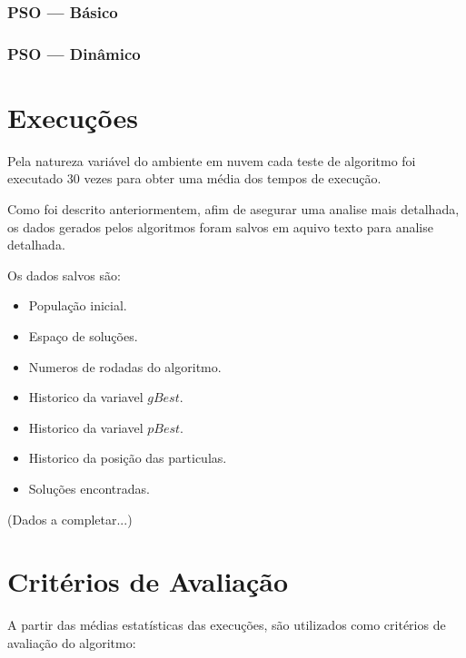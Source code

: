         \subsubsection{PSO — Básico}

        \subsubsection{PSO — Dinâmico}

    



\section{Execuções}
    Pela natureza variável do ambiente em nuvem cada teste de algoritmo foi executado 30 vezes para obter uma média dos tempos de execução.\newline
    
    Como foi descrito anteriormentem, afim de asegurar uma analise mais detalhada, os dados gerados pelos algoritmos foram salvos em aquivo texto para analise detalhada.\newline
    
    Os dados salvos são:
    \begin{itemize}
        \item População inicial.
        \item Espaço de soluções.
        \item Numeros de rodadas do algoritmo.
        \item Historico da variavel $gBest$.
        \item Historico da variavel $pBest$.
        \item Historico da posição das particulas.
        \item Soluções encontradas.
    \end{itemize}
    
    (Dados a completar...)


\section{Critérios de Avaliação}
    A partir das médias estatísticas das execuções, são utilizados como critérios de avaliação do algoritmo: \newline
    
